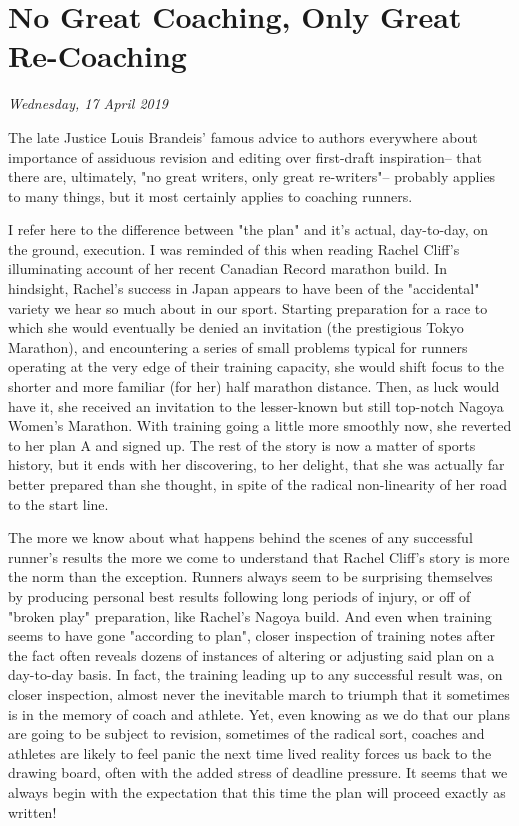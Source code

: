 \chapter{No Great Coaching, Only Great Re-Coaching}
\textit{Wednesday, 17 April 2019}
\bigskip

The late Justice Louis Brandeis' famous advice to authors everywhere about importance of assiduous revision and editing over first-draft inspiration-- that there are, ultimately, "no great writers, only great re-writers"-- probably applies to many things, but it most certainly applies to coaching runners.

I refer here to the difference between "the plan" and it's actual, day-to-day, on the ground, execution. I was reminded of this when reading Rachel Cliff's illuminating account of her recent Canadian Record marathon build. In hindsight, Rachel's success in Japan appears to have been of the "accidental" variety we hear so much about in our sport. Starting preparation for a race to which she would eventually be denied an invitation (the prestigious Tokyo Marathon), and encountering a series of small problems typical for runners operating at the very edge of their training capacity, she would shift focus to the shorter and more familiar (for her) half marathon distance. Then, as luck would have it, she received an invitation to the lesser-known but still top-notch Nagoya Women's Marathon. With training going a little more smoothly now, she reverted to her plan A and signed up. The rest of the story is now a matter of sports history, but it ends with her discovering, to her delight, that she was actually far better prepared than she thought, in spite of the radical non-linearity of her road to the start line.

The more we know about what happens behind the scenes of any successful runner's results the more we come to understand that Rachel Cliff's story is more the norm than the exception. Runners always seem to be surprising themselves by producing personal best results following long periods of injury, or off of "broken play" preparation, like Rachel's Nagoya build. And even when training seems to have gone "according to plan", closer inspection of training notes after the fact often reveals dozens of instances of altering or adjusting said plan on a day-to-day basis. In fact, the training leading up to any successful result was, on closer inspection, almost never the inevitable march to triumph that it sometimes is in the memory of coach and athlete. Yet, even knowing as we do that our plans are going to be subject to revision, sometimes of the radical sort, coaches and athletes are likely to feel panic the next time lived reality forces us back to the drawing board, often with the added stress of deadline pressure. It seems that we always begin with the expectation that this time the plan will proceed exactly as written!

